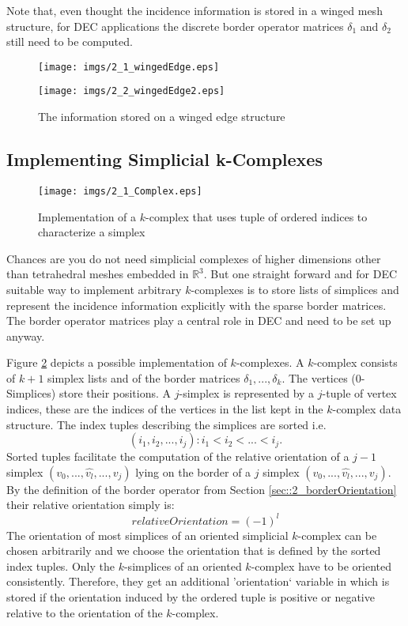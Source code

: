 Note that, even thought the incidence information is stored in a winged mesh structure, for DEC applications the discrete border operator matrices $\delta_1$ and $\delta_2$ still need to be computed.

\begin{figure}[tb]
\begin{center}
\texttt{[image: imgs/2\_1\_wingedEdge.eps]}%
\vspace{0.5cm}

\texttt{[image: imgs/2\_2\_wingedEdge2.eps]}
\end{center}
\caption{The information stored on a winged edge structure}%
\label{figs::2_1_wingedEdge}%
\end{figure}


\subsection{Implementing Simplicial k-Complexes }

\begin{figure}[t]
	\begin{center}
	\texttt{[image: imgs/2\_1\_Complex.eps]}%
	\end{center}
	\caption{Implementation of a $k$-complex that uses tuple of ordered indices to characterize a simplex}%
	\label{fig::2_1_Complex}%
\end{figure}

Chances are you do not need simplicial complexes of higher dimensions other than tetrahedral meshes embedded in $\mathbb R^3$. But one straight forward and for DEC suitable way to implement arbitrary $k$-complexes is to store lists of simplices and represent the incidence information explicitly with the sparse border matrices. The border operator matrices play a central role in DEC and need to be set up anyway.

Figure \ref{fig::2_1_Complex} depicts a possible implementation of $k$-complexes.  A $k$-complex consists of $k+1$ simplex lists and of the border matrices $\delta_1,...,\delta_k$. The vertices (0-Simplices) store their positions. A $j$-simplex is represented by a $j$-tuple of vertex indices, these are the indices of the vertices in the list kept in the $k$-complex data structure. The index tuples describing the simplices are sorted i.e.
\[(i_1,i_2,...,i_j): i_1 < i_2 <...<i_j.\] 
Sorted tuples facilitate the computation of the relative orientation of a $j-1$ simplex $(v_0,...,\widehat{v_l},..., v_{j})$ lying on the border of a $j$ simplex $(v_0,...,\widehat{v_l},..., v_{j})$. By the definition of the border operator from Section \ref{sec::2_borderOrientation} their relative orientation simply is:
\[relativeOrientation = (-1)^l\]
The orientation of most simplices of an oriented simplicial $k$-complex can be chosen arbitrarily and we choose the orientation that is defined by the sorted index tuples. Only the $k$-simplices of an oriented $k$-complex have to be oriented consistently. Therefore, they get an additional 'orientation` variable in which is stored if the orientation induced by the ordered tuple is positive or negative relative to the orientation of the $k$-complex.


